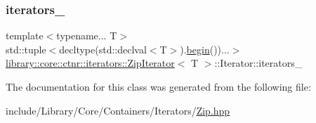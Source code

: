 \subsubsection{\texorpdfstring{iterators\+\_\+}{iterators\_}}
{\footnotesize\ttfamily template$<$typename... T$>$ \\
std\+::tuple$<$decltype(std\+::declval$<$T$>$).\hyperlink{classlibrary_1_1core_1_1ctnr_1_1iterators_1_1_zip_iterator_a0467e25b565ac7b73b22a7002b87d189}{begin}())...$>$ \hyperlink{classlibrary_1_1core_1_1ctnr_1_1iterators_1_1_zip_iterator}{library\+::core\+::ctnr\+::iterators\+::\+Zip\+Iterator}$<$ T $>$\+::Iterator\+::iterators\+\_\+}



The documentation for this class was generated from the following file\+:\begin{DoxyCompactItemize}
\item 
include/\+Library/\+Core/\+Containers/\+Iterators/\hyperlink{_zip_8hpp}{Zip.\+hpp}\end{DoxyCompactItemize}
